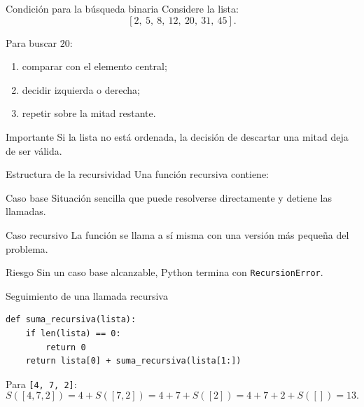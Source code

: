 \documentclass[10pt]{beamer}
\begin{document}
\begin{frame}{Condición para la búsqueda binaria}
  Considere la lista:
  \[
    [2,\ 5,\ 8,\ 12,\ 20,\ 31,\ 45].
  \]

  Para buscar \(20\):
  \begin{enumerate}
    \item comparar con el elemento central;
    \item decidir izquierda o derecha;
    \item repetir sobre la mitad restante.
  \end{enumerate}

  \begin{alertblock}{Importante}
    Si la lista no está ordenada, la decisión de descartar una mitad deja de ser válida.
  \end{alertblock}
\end{frame}

\begin{frame}{Estructura de la recursividad}
  Una función recursiva contiene:

  \begin{block}{Caso base}
    Situación sencilla que puede resolverse directamente y detiene las llamadas.
  \end{block}

  \begin{block}{Caso recursivo}
    La función se llama a sí misma con una versión más pequeña del problema.
  \end{block}

  \begin{alertblock}{Riesgo}
    Sin un caso base alcanzable, Python termina con \texttt{RecursionError}.
  \end{alertblock}
\end{frame}

\begin{frame}[fragile]{Seguimiento de una llamada recursiva}
\begin{verbatim}
def suma_recursiva(lista):
    if len(lista) == 0:
        return 0
    return lista[0] + suma_recursiva(lista[1:])
\end{verbatim}

  Para \texttt{[4, 7, 2]}:
  \[
    S([4,7,2])=4+S([7,2])
    =4+7+S([2])
    =4+7+2+S([])
    =13.
  \]
\end{frame}
\end{document}
